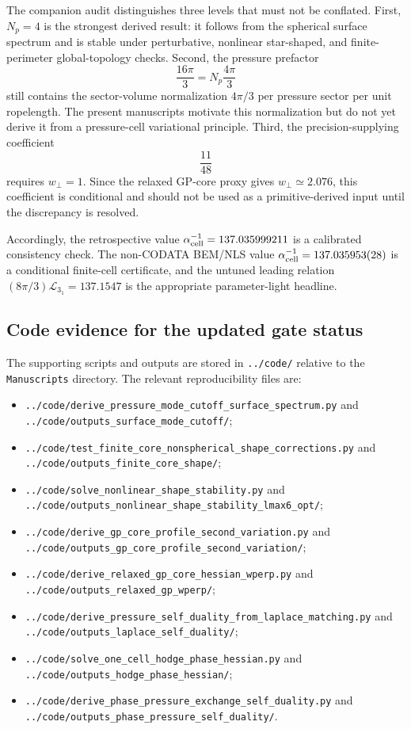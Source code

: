 \documentclass[aps,pra,preprint,longbibliography,nofootinbib]{revtex4-2}
\begin{document}
The companion audit distinguishes three levels that must not be conflated.  First,
\(N_p=4\) is the strongest derived result: it follows from the spherical surface
spectrum and is stable under perturbative, nonlinear star-shaped, and
finite-perimeter global-topology checks.  Second, the pressure prefactor
\[
  \frac{16\pi}{3}=N_p\frac{4\pi}{3}
\]
still contains the sector-volume normalization \(4\pi/3\) per pressure sector
per unit ropelength.  The present manuscripts motivate this normalization but
do not yet derive it from a pressure-cell variational principle.  Third, the
precision-supplying coefficient
\[
  \frac{11}{48}
\]
requires \(w_\perp=1\).  Since the relaxed GP-core proxy gives
\(w_\perp\simeq2.076\), this coefficient is conditional and should not be used
as a primitive-derived input until the discrepancy is resolved.

Accordingly, the retrospective value
\(\alpha_{\rm cell}^{-1}=137.035999211\) is a calibrated consistency check.
The non-CODATA BEM/NLS value \(\alpha_{\rm cell}^{-1}=137.035953(28)\) is a
conditional finite-cell certificate, and the untuned leading relation
\((8\pi/3)\mathcal L_{3_1}=137.1547\) is the appropriate parameter-light
headline.

\subsection*{Code evidence for the updated gate status}

The supporting scripts and outputs are stored in \texttt{../code/} relative to
the \texttt{Manuscripts} directory.  The relevant reproducibility files are:
\begin{itemize}
\item \texttt{../code/derive\_pressure\_mode\_cutoff\_surface\_spectrum.py}
and \texttt{../code/outputs\_surface\_mode\_cutoff/};
\item \texttt{../code/test\_finite\_core\_nonspherical\_shape\_corrections.py}
and \texttt{../code/outputs\_finite\_core\_shape/};
\item \texttt{../code/solve\_nonlinear\_shape\_stability.py} and
\texttt{../code/outputs\_nonlinear\_shape\_stability\_lmax6\_opt/};
\item \texttt{../code/derive\_gp\_core\_profile\_second\_variation.py} and
\texttt{../code/outputs\_gp\_core\_profile\_second\_variation/};
\item \texttt{../code/derive\_relaxed\_gp\_core\_hessian\_wperp.py} and
\texttt{../code/outputs\_relaxed\_gp\_wperp/};
\item \texttt{../code/derive\_pressure\_self\_duality\_from\_laplace\_matching.py}
and \texttt{../code/outputs\_laplace\_self\_duality/};
\item \texttt{../code/solve\_one\_cell\_hodge\_phase\_hessian.py} and
\texttt{../code/outputs\_hodge\_phase\_hessian/};
\item \texttt{../code/derive\_phase\_pressure\_exchange\_self\_duality.py} and
\texttt{../code/outputs\_phase\_pressure\_self\_duality/}.
\end{itemize}
\end{document}
